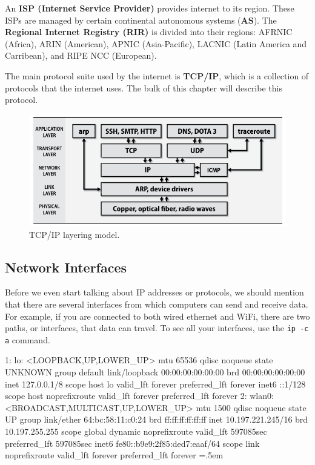 \documentclass{article}
\theoremstyle{definition}
\newenvironment{cverbatim}
    {\SaveVerbatim{cverb}}
    {\endSaveVerbatim
    \flushleft\fboxrule=0pt\fboxsep=.5em
    \colorbox{cverbbg}{%
      \makebox[\dimexpr\linewidth-2\fboxsep][l]{\BUseVerbatim{cverb}}%
    }
    \endflushleft
  }
\begin{document}
    An \textbf{ISP (Internet Service Provider)} provides internet to its region. These ISPs are managed by certain continental autonomous systems (\textbf{AS}). The \textbf{Regional Internet Registry (RIR)} is divided into their regions: AFRNIC (Africa), ARIN (American), APNIC (Asia-Pacific), LACNIC (Latin America and Carribean), and RIPE NCC (European). 

    The main protocol suite used by the internet is \textbf{TCP/IP}, which is a collection of protocols that the internet uses. The bulk of this chapter will describe this protocol. 

    \begin{figure}[hbt!]
      \centering
      \includegraphics[scale=0.7]{img/tcp_ip_model.png}
      \caption{TCP/IP layering model. }
      \label{fig:tcp_ip_model}
    \end{figure}

  \subsection{Network Interfaces}

    Before we even start talking about IP addresses or protocols, we should mention that there are several interfaces from which computers can send and receive data. For example, if you are connected to both wired ethernet and WiFi, there are two paths, or interfaces, that data can travel. To see all your interfaces, use the \texttt{ip -c a} command. 

    \begin{cverbatim} 
      1: lo: <LOOPBACK,UP,LOWER_UP> mtu 65536 qdisc noqueue state UNKNOWN group default  
          link/loopback 00:00:00:00:00:00 brd 00:00:00:00:00:00
          inet 127.0.0.1/8 scope host lo
             valid_lft forever preferred_lft forever
          inet6 ::1/128 scope host noprefixroute 
             valid_lft forever preferred_lft forever
      2: wlan0: <BROADCAST,MULTICAST,UP,LOWER_UP> mtu 1500 qdisc noqueue state UP group 
          link/ether 64:bc:58:11:c0:24 brd ff:ff:ff:ff:ff:ff
          inet 10.197.221.245/16 brd 10.197.255.255 scope global dynamic noprefixroute 
             valid_lft 597085sec preferred_lft 597085sec
          inet6 fe80::b9e9:2f85:ded7:eaaf/64 scope link noprefixroute 
             valid_lft forever preferred_lft forever
    \end{cverbatim}
\end{document}
